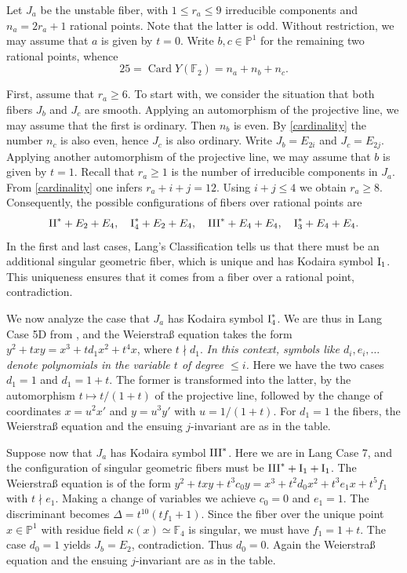 \documentclass[oneside, 12pt]{amsart}
\theoremstyle{definition}
\theoremstyle{remark}
\newcommand{\FF}{\mathbb{F}}
\newcommand{\PP}{\mathbb{P}}
\newcommand{\Card}{\operatorname{Card}}
\newcommand{\I}{\text{\rm I}}
\newcommand{\II}{\text{\rm II}}
\newcommand{\III}{\text{\rm III}}
\begin{document}
\proof
Let $J_a$ be the unstable fiber, with $1\leq r_a\leq 9$ irreducible components and $n_a=2r_a+1$ rational points. 
Note that the latter is odd.
Without restriction, we may assume that $a$ is given by $t=0$. Write $b,c\in\PP^1$ for the remaining two rational points,
whence
\begin{equation}
\label{cardinality}
25=\Card Y(\FF_2) = n_a+n_b+n_c.
\end{equation}

First, assume that $r_a\geq 6$.
To start with, we consider the situation that both fibers $J_b$ and $J_c$ are smooth.
Applying an automorphism of the projective line, we may assume that the first is ordinary. Then $n_b$ is even.
By \eqref{cardinality} the number $n_c$ is also even, hence $J_c$ is also ordinary.
Write  $J_b=E_{2i}$ and $J_c=E_{2j}$. Applying another automorphism of the projective line,  we may assume
that $b$ is given by $t=1$. Recall that $r_a\geq 1$ is the number of irreducible components in $J_a$.
 From \eqref{cardinality} one infers $r_a+i+j=12$.
Using $i+j\leq 4$ we obtain $r_a\geq 8$.
Consequently, the possible configurations of   fibers over rational points are 
$$
\II^*+E_2+E_4,\quad \I_4^*+E_2+E_4,\quad \III^*+E_4+E_4,\quad \I_3^*+E_4+E_4.
$$
In the first and last cases, Lang's Classification \cite{Lang 2000} tells us that
there must be an additional singular geometric fiber, which is unique and has Kodaira symbol $\I_1$.
This uniqueness ensures that it comes from a  fiber over a rational point, contradiction.

We now analyze the case that $J_a$ has Kodaira symbol $\I_4^*$.
We are thus in Lang Case 5D from \cite{Lang 2000}, and the Weierstra\ss{} equation takes the form
$y^2+txy=x^3+td_1x^2+t^4x$, where $t\nmid d_1$.
\emph{In this context, symbols like $d_i,e_i,\ldots$ denote   polynomials in the variable $t$ of degree $\leq i$.}
Here we have the two cases $d_1=1$ and $d_1=1+t$. The former is transformed into the latter, 
by the automorphism $t\mapsto t/(1+t)$ of the projective line,  followed by the change of coordinates 
$x=u^2x'$ and $y=u^3y'$ with $u=1/(1+t)$.
For $d_1=1$ the fibers, the  Weierstra\ss{} equation and the ensuing $j$-invariant are as in the table.

Suppose now that $J_a$ has Kodaira symbol $\III^*$.
Here we are in Lang Case 7, 
and the configuration of singular geometric fibers  must
be $\III^*+\I_1+\I_1$. The Weierstra\ss{} equation is of the form
$y^2+txy+t^3c_0y=x^3+t^2d_0x^2+ t^3e_1x+t^5f_1$ with $t\nmid e_1$.
Making a change of variables we achieve $c_0=0$ and $e_1=1$.
The discriminant becomes $\Delta=t^{10}(tf_1+1)$.
Since the fiber over  the unique point $x\in\PP^1$ with residue field $\kappa(x)\simeq \FF_4$
is singular, we must have $f_1=1+t$.
The case $d_0=1$ yields $J_b=E_2$, contradiction. Thus $d_0=0$.
Again the Weierstra\ss{} equation and the ensuing $j$-invariant are as in the table.
\end{document}
